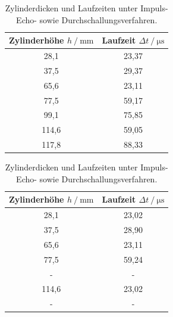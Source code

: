 \begin{table}[H]
    \begin{subtable}{0.5\textwidth}
        \centering
        \caption{Laufzeitbestimmung über Impuls-Echo-Verfahren.}
        \label{tab:1a}  
        \begin{tabular}{c c}
        \toprule 
        {Zylinderhöhe $h \mathbin{/} \unit{\milli\meter}$} & {Laufzeit $\Delta t \mathbin{/} \unit{\micro\second}$} \\
        \midrule 
         28,1      &       23,37       \\ 
         37,5      &       29,37       \\  
         65,6      &       23,11       \\
         77,5      &       59,17       \\ 
         99,1      &       75,85       \\ 
        114,6      &       59,05       \\
        117,8      &       88,33       \\  
        \bottomrule
        \end{tabular}   
    \end{subtable}
    \begin{subtable}{0.5\textwidth}
        \centering
        \caption{Laufzeitbestimmung über Durchschallungsverfahren.}
        \label{tab:1b} 
        \begin{tabular}{c c}
        \toprule 
        {Zylinderhöhe $h \mathbin{/} \unit{\milli\meter}$} & {Laufzeit $\Delta t \mathbin{/} \unit{\micro\second}$} \\
        \midrule 
         28,1       &       23,02       \\   
         37,5       &       28,90       \\
         65,6       &       23,11       \\   
         77,5       &       59,24       \\
         -          &       -           \\      
        114,6       &       23,02       \\ 
         -          &       -           \\
        \bottomrule
        \end{tabular}  
    \end{subtable}
 \caption{Zylinderdicken und Laufzeiten unter Impuls-Echo- sowie Durchschallungsverfahren.} 
\end{table}

